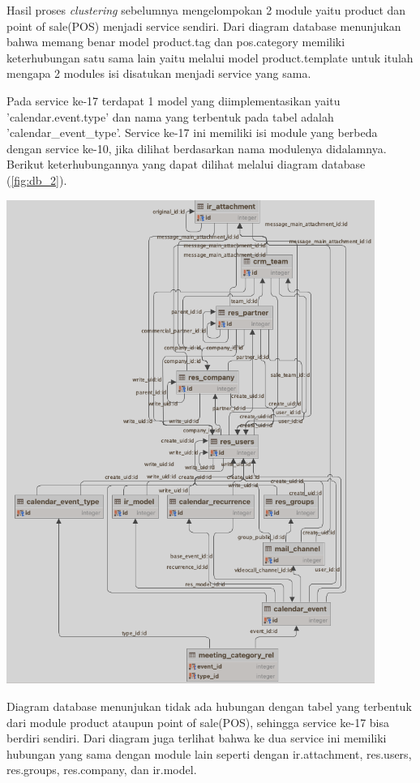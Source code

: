 Hasil proses \textit{clustering} sebelumnya mengelompokan 2 module yaitu product dan point of sale(POS) menjadi service sendiri. Dari diagram database menunjukan bahwa memang benar model product.tag dan pos.category memiliki keterhubungan satu sama lain yaitu melalui model product.template untuk itulah mengapa 2 modules isi disatukan menjadi service yang sama.  

Pada service ke-17 terdapat 1 model yang diimplementasikan yaitu  'calendar.event.type' dan nama yang terbentuk pada tabel adalah 'calendar\_event\_type'. Service ke-17 ini memiliki isi module yang berbeda dengan service ke-10, jika dilihat berdasarkan nama modulenya didalamnya. Berikut keterhubungannya yang dapat dilihat melalui diagram database (\ref{fig:db_2}).

\begin{center}
	\includegraphics[width=12cm]{img/bab_4/db_2.png}
	\label{fig:db_2}
\end{center}

Diagram database menunjukan tidak ada hubungan dengan tabel yang terbentuk dari module product ataupun point of sale(POS), sehingga service ke-17 bisa berdiri sendiri. Dari diagram juga terlihat bahwa ke dua service ini memiliki hubungan yang sama dengan module lain seperti dengan ir.attachment, res.users, res.groups, res.company, dan ir.model. 